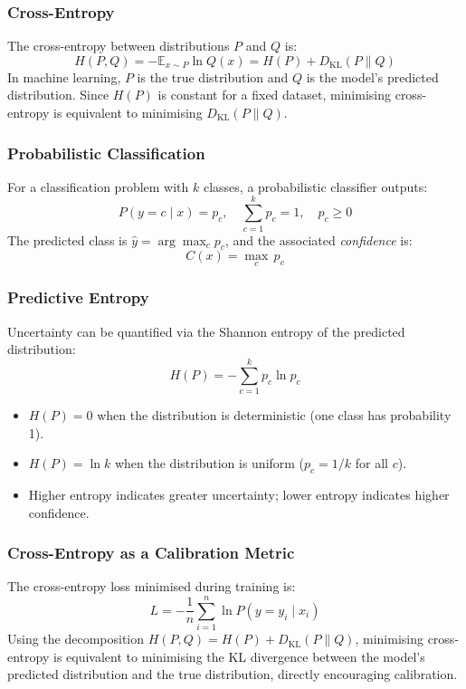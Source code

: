 \documentclass[11pt]{article}
\begin{document}
\subsubsection{Cross-Entropy}

The cross-entropy between distributions $P$ and $Q$ is:
\[
    H(P, Q) = -\mathbb{E}_{x \sim P} \ln Q(x) = H(P) + D_{\mathrm{KL}}(P \| Q)
\]
In machine learning, $P$ is the true distribution and $Q$ is the model's predicted distribution. Since $H(P)$ is constant for a fixed dataset, minimising cross-entropy is equivalent to minimising $D_{\mathrm{KL}}(P \| Q)$.

\subsubsection{Probabilistic Classification}

For a classification problem with $k$ classes, a probabilistic classifier outputs:
\[
    P(y = c \mid x) = p_c, \quad \sum_{c=1}^{k} p_c = 1, \quad p_c \geq 0
\]
The predicted class is $\hat{y} = \arg\max_c p_c$, and the associated \emph{confidence} is:
\[
    C(x) = \max_c \, p_c
\]

\subsubsection{Predictive Entropy}

Uncertainty can be quantified via the Shannon entropy of the predicted distribution:
\[
    H(P) = -\sum_{c=1}^{k} p_c \ln p_c
\]
\begin{itemize}[leftmargin=2em]
    \item $H(P) = 0$ when the distribution is deterministic (one class has probability 1).
    \item $H(P) = \ln k$ when the distribution is uniform ($p_c = 1/k$ for all $c$).
    \item Higher entropy indicates greater uncertainty; lower entropy indicates higher confidence.
\end{itemize}
\subsubsection{Cross-Entropy as a Calibration Metric}

The cross-entropy loss minimised during training is:
\[
    L = -\frac{1}{n} \sum_{i=1}^{n} \ln P(y = y_i \mid x_i)
\]
Using the decomposition $H(P, Q) = H(P) + D_{\mathrm{KL}}(P \| Q)$, minimising cross-entropy is equivalent to minimising the KL divergence between the model's predicted distribution and the true distribution, directly encouraging calibration.
\end{document}

